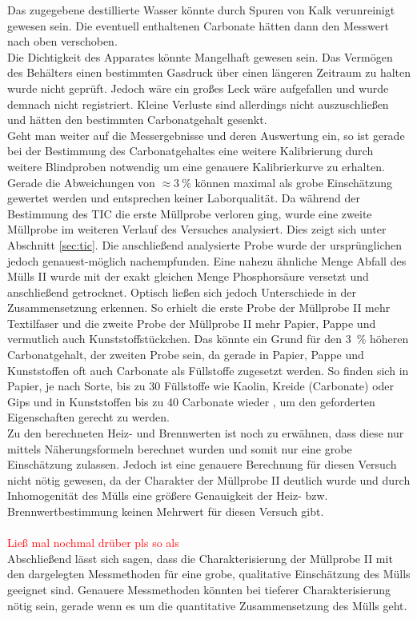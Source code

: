 Das zugegebene destillierte Wasser könnte durch Spuren von Kalk verunreinigt gewesen sein. Die eventuell enthaltenen Carbonate hätten dann den Messwert nach oben verschoben.\\
Die Dichtigkeit des Apparates könnte Mangelhaft gewesen sein. Das Vermögen des Behälters einen bestimmten Gasdruck über einen längeren Zeitraum zu halten wurde nicht geprüft. Jedoch wäre ein großes Leck wäre aufgefallen und wurde demnach nicht registriert. Kleine Verluste sind allerdings nicht auszuschließen und hätten den bestimmten Carbonatgehalt gesenkt.\\
Geht man weiter auf die Messergebnisse und deren Auswertung ein, so ist gerade bei der Bestimmung des Carbonatgehaltes eine weitere Kalibrierung durch weitere Blindproben notwendig um eine genauere Kalibrierkurve zu erhalten. Gerade die Abweichungen von $\approx \SI{3}{\percent}$ können maximal als grobe Einschätzung gewertet werden und entsprechen keiner Laborqualität.\linebreak
Da während der Bestimmung des TIC die erste Müllprobe verloren ging, wurde eine zweite Müllprobe im weiteren Verlauf des Versuches analysiert. Dies zeigt sich unter Abschnitt \ref{sec:tic}. Die anschließend analysierte Probe wurde der ursprünglichen jedoch genauest-möglich nachempfunden. Eine nahezu ähnliche Menge Abfall des Mülls II wurde mit der exakt gleichen Menge Phosphorsäure versetzt und anschließend getrocknet.\linebreak
Optisch ließen sich jedoch Unterschiede in der Zusammensetzung erkennen. So erhielt die erste Probe der Müllprobe II mehr Textilfaser und die zweite Probe der Müllprobe II mehr Papier, Pappe und vermutlich auch Kunststoffstückchen.\linebreak
Das könnte ein Grund für den \SI{3}{\percent} höheren Carbonatgehalt, der zweiten Probe sein, da gerade in Papier, Pappe und Kunststoffen oft auch Carbonate als Füllstoffe zugesetzt werden. So finden sich in Papier, je nach Sorte, bis zu \SI{30}{\mpercent} Füllstoffe wie Kaolin, Kreide (Carbonate) oder Gips \cite{Wikipedia.21.11.2019} und in Kunststoffen bis zu  \SI{40}{\mpercent} Carbonate wieder \cite{PolymerServiceGmbHMerseburg.13.08.2019}, um den geforderten Eigenschaften gerecht zu werden.\\
Zu den berechneten Heiz- und Brennwerten ist noch zu erwähnen, dass diese nur mittels Näherungsformeln berechnet wurden und somit nur eine grobe Einschätzung zulassen. Jedoch ist eine genauere Berechnung für diesen Versuch nicht nötig gewesen, da der Charakter der Müllprobe II deutlich wurde und durch Inhomogenität des Mülls eine größere Genauigkeit der Heiz- bzw. Brennwertbestimmung keinen Mehrwert für diesen Versuch gibt.\\ \\
\textcolor{red}{Ließ mal nochmal drüber pls so als}\\
Abschließend lässt sich sagen, dass die Charakterisierung der Müllprobe II mit den dargelegten Messmethoden für eine grobe, qualitative Einschätzung des Mülls geeignet sind. Genauere Messmethoden könnten bei tieferer Charakterisierung nötig sein, gerade wenn es um die quantitative Zusammensetzung des Mülls geht.